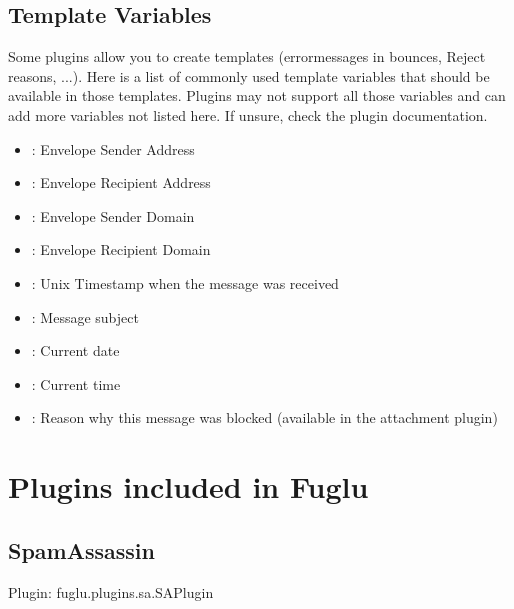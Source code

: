 \documentclass[letterpaper,10pt,english]{sphinxmanual}
\begin{document}
\subsection{Template Variables}
\label{plugins-index:template-variables}
Some plugins allow you to create templates (errormessages in bounces, Reject reasons, ...). Here is a list of commonly used template variables that should be available in those templates. Plugins may not support all those variables and can add more variables not listed here. If unsure, check the plugin documentation.
\begin{itemize}
\item {} 
 : Envelope Sender Address

\item {} 
   : Envelope Recipient Address

\item {} 
  : Envelope Sender Domain

\item {} 
    : Envelope Recipient Domain

\item {} 
    : Unix Timestamp when the message was received

\item {} 
      : Message subject

\item {} 
         : Current date

\item {} 
         : Current time

\item {} 
    : Reason why this message was blocked (available in the attachment plugin)

\end{itemize}


\section{Plugins included in Fuglu}
\label{plugins-index:plugins-included-in-fuglu}

\subsection{SpamAssassin}
\label{plugins-index:spamassassin}
Plugin: fuglu.plugins.sa.SAPlugin
\end{document}
